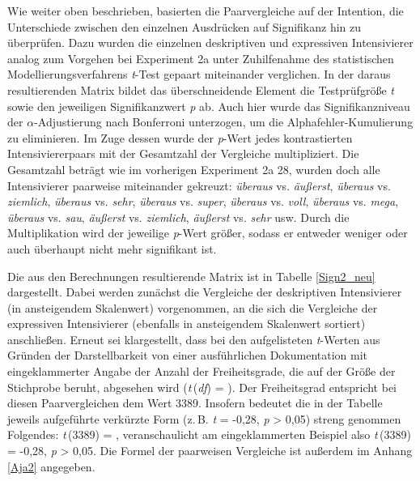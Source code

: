 Wie weiter oben beschrieben, basierten die Paarvergleiche auf der Intention, die Unterschiede zwischen den einzelnen Ausdrücken auf Signifikanz hin zu überprüfen. Dazu wurden die einzelnen deskriptiven und expressiven Intensivierer analog zum Vorgehen bei Experiment 2a unter Zuhilfenahme des statistischen Modellierungsverfahrens \textit{t}-Test gepaart miteinander verglichen. In der daraus resultierenden Matrix bildet das überschneidende Element die Testprüfgröße \textit{t} sowie den jeweiligen Signifikanzwert \textit{p} ab. Auch hier wurde das Signifikanzniveau der $\alpha$-Adjustierung nach Bonferroni unterzogen, um die Alphafehler-Kumulierung zu eliminieren. Im Zuge dessen wurde der {\textit{p}-Wert} jedes kontrastierten Intensiviererpaars mit der Gesamtzahl der Vergleiche multipliziert. Die Gesamtzahl beträgt wie im vorherigen {Experiment 2a} 28, wurden doch alle Intensivierer paarweise miteinander gekreuzt: \textit{überaus} vs. \textit{äußerst}, \textit{überaus} vs. \textit{ziemlich}, \textit{überaus} vs. \textit{sehr}, \textit{überaus} vs. \textit{super}, \textit{überaus} vs. \textit{voll}, \textit{überaus} vs. \textit{mega}, \textit{überaus} vs. \textit{sau}, \textit{äußerst} vs. \textit{ziemlich}, \textit{äußerst} vs. \textit{sehr} usw. Durch die Multiplikation wird der jeweilige \textit{p}-Wert größer, sodass er entweder weniger oder auch überhaupt nicht mehr signifikant ist.


Die aus den Berechnungen resultierende Matrix ist in Tabelle \ref{Sign2_neu} dargestellt. Dabei werden zunächst die Vergleiche der deskriptiven Intensivierer (in ansteigendem Skalenwert) vorgenommen, an die sich die Vergleiche der expressiven Intensivierer (ebenfalls in ansteigendem Skalenwert sortiert) anschließen. Erneut sei klargestellt, dass bei den aufgelisteten \textit{t}-Werten aus Gründen der Darstellbarkeit von einer ausführlichen Dokumentation mit eingeklammerter Angabe der Anzahl der Freiheitsgrade, die auf der Größe der Stichprobe beruht, abgesehen wird {(\textit{t}\,(\textit{\textit{df}}) = \textelp{})}. Der Freiheitsgrad entspricht bei diesen Paarvergleichen dem Wert 3389. Insofern bedeutet die in der Tabelle jeweils aufgeführte verkürzte Form (z.\,B. {\textit{t} = -0,28}, {\textit{p} > 0,05}) streng genommen Folgendes: \textit{t}\,(3389) = \textelp{}, veranschaulicht am eingeklammerten Beispiel also {\textit{t}\,(3389) = -0,28}, {\textit{p} > 0,05}. Die Formel der paarweisen Vergleiche ist außerdem im Anhang \ref{Aja2} angegeben.






